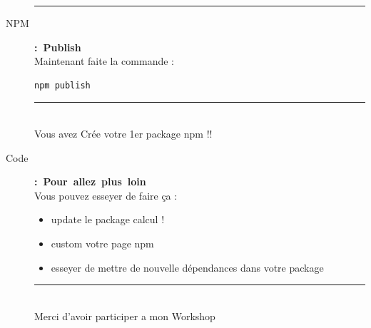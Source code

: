 \documentclass{article}
\begin{document}
\begin{description}
\begin{itemize}
        \end{itemize}
        \begin{center} 
            \rule{0.75\linewidth}{1pt}
        \end{center}
        \item [NPM] \mbox{\textbf{: Publish}} \\ Maintenant faite la commande :
\begin{lstlisting}[language=sh]
    npm publish
\end{lstlisting}
        \begin{center}
            \rule{0.75\linewidth}{1pt} \\
            Vous avez Crée votre 1er package npm !!
        \end{center}
        \item [Code] \mbox{\textbf{: Pour allez plus loin}} \\ Vous pouvez esseyer de faire ça :
        \begin{itemize}
            \item update le package calcul !
            \item custom votre page npm
            \item esseyer de mettre de nouvelle dépendances dans votre package
        \end{itemize}
        \begin{center}
            \rule{0.75\linewidth}{1pt} \\ Merci d'avoir participer a mon Workshop
        \end{center}
    \end{description}
\end{document}
